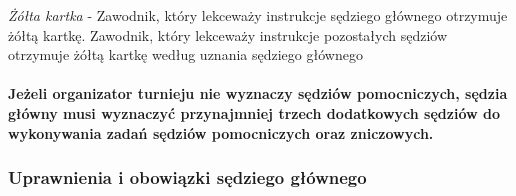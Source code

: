 \documentclass[12pt]{article}
\begin{document}
\emph{Żółta kartka} - Zawodnik, który lekceważy instrukcje sędziego
głównego otrzymuje żółtą kartkę. Zawodnik, który lekceważy instrukcje
pozostałych sędziów otrzymuje żółtą kartkę według uznania sędziego
głównego

\paragraph{Jeżeli organizator turnieju nie wyznaczy sędziów
pomocniczych, sędzia główny musi wyznaczyć przynajmniej trzech
dodatkowych sędziów do wykonywania zadań sędziów pomocniczych oraz
zniczowych.}

\subsubsection{Uprawnienia i obowiązki sędziego głównego}
\end{document}
